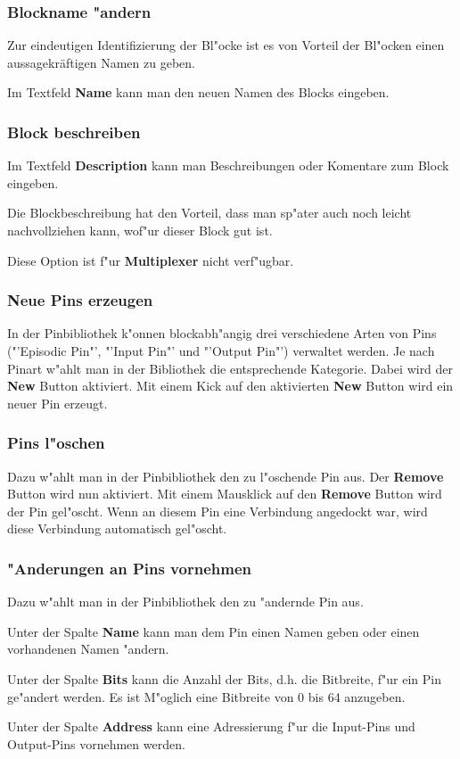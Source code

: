 \documentclass[a4paper,titlepage,12pt,ngerman]{scrbook}
\begin{document}
\subsubsection{Blockname "andern}
Zur eindeutigen Identifizierung der Bl"ocke ist es von Vorteil der Bl"ocken einen aussagekräftigen Namen zu geben.\par
Im Textfeld {\bf Name} kann man den neuen Namen des Blocks eingeben.
\subsubsection{Block beschreiben}
Im Textfeld {\bf Description} kann man Beschreibungen oder Komentare zum Block eingeben.\par
Die Blockbeschreibung hat den Vorteil, dass man sp"ater auch noch leicht nachvollziehen kann, wof"ur dieser Block gut ist.\par
Diese Option ist f"ur {\bf Multiplexer} nicht verf"ugbar.
\subsubsection{Neue Pins erzeugen}
In der Pinbibliothek k"onnen blockabh"angig drei verschiedene Arten von Pins ("'Episodic Pin"', "'Input Pin"' und "'Output Pin"') verwaltet werden. Je nach Pinart w"ahlt man in der Bibliothek die entsprechende Kategorie. Dabei wird der {\bf New} Button aktiviert. Mit einem Kick auf den aktivierten {\bf New} Button wird ein neuer Pin erzeugt. \par
\subsubsection{Pins l"oschen}
Dazu w"ahlt man in der Pinbibliothek den zu l"oschende Pin aus. Der {\bf Remove} Button wird nun aktiviert. Mit einem Mausklick auf den {\bf Remove} Button wird der Pin gel"oscht. Wenn an diesem Pin eine Verbindung angedockt war, wird diese Verbindung automatisch gel"oscht.
\subsubsection{"Anderungen an Pins vornehmen}
Dazu w"ahlt man in der Pinbibliothek den zu "andernde Pin aus.\par
Unter der Spalte {\bf Name} kann man dem Pin einen Namen geben oder einen vorhandenen Namen "andern.\par
Unter der Spalte {\bf Bits} kann die Anzahl der Bits, d.h. die Bitbreite, f"ur ein Pin ge"andert werden. Es ist M"oglich eine Bitbreite von 0 bis 64 anzugeben.\par
Unter der Spalte {\bf Address} kann eine Adressierung f"ur die Input-Pins und Output-Pins vornehmen werden.\par
\end{document}
